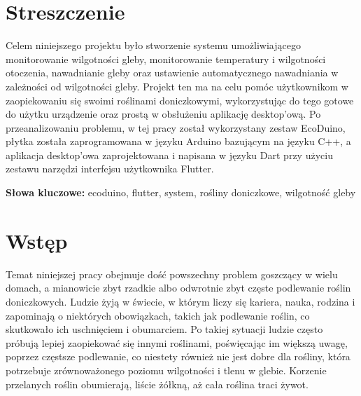 \documentclass[a4paper,twoside,12pt]{book}
\newcounter{stronyPozaNumeracja}
\begin{document}
\pagestyle{tylkoNumeryStron}
\tableofcontents

\setcounter{stronyPozaNumeracja}{\value{page}}
\mainmatter
\pagestyle{empty}

\chapter*{Streszczenie}

Celem niniejszego projektu było stworzenie systemu umożliwiającego monitorowanie wilgotności gleby, monitorowanie temperatury i wilgotności otoczenia, nawadnianie gleby oraz ustawienie automatycznego nawadniania w zależności od wilgotności gleby. Projekt ten ma na celu pomóc użytkownikom w zaopiekowaniu się swoimi roślinami doniczkowymi, wykorzystując do tego gotowe do użytku urządzenie oraz prostą w obsłużeniu aplikację desktop'ową. Po przeanalizowaniu problemu, w tej pracy został wykorzystany zestaw EcoDuino, płytka została zaprogramowana w języku Arduino bazującym na języku C++, a aplikacja desktop'owa zaprojektowana i napisana w języku Dart przy użyciu zestawu narzędzi interfejsu użytkownika Flutter.

   {\bf Słowa kluczowe:} ecoduino, flutter, system, rośliny doniczkowe, wilgotność gleby


\cleardoublepage

\pagestyle{NumeryStronNazwyRozdzialow}


\chapter{Wstęp}

Temat niniejszej pracy obejmuje dość powszechny problem goszczący w wielu domach, a mianowicie zbyt rzadkie albo odwrotnie zbyt częste podlewanie roślin doniczkowych. Ludzie żyją w świecie, w którym liczy się kariera, nauka, rodzina i zapominają o niektórych obowiązkach, takich jak podlewanie roślin, co skutkowało ich uschnięciem i obumarciem. Po takiej sytuacji ludzie często próbują lepiej zaopiekować się innymi roślinami, poświęcając im większą uwagę, poprzez częstsze podlewanie, co niestety również nie jest dobre dla rośliny, która potrzebuje zrównoważonego poziomu wilgotności i tlenu w glebie. Korzenie przelanych roślin obumierają, liście żółkną, aż cała roślina traci żywot.
\end{document}
